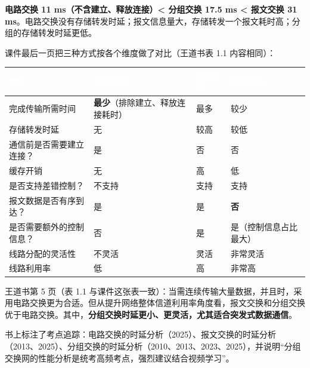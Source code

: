 \documentclass[10.5pt,a4paper,oneside]{article}
\newcommand{\hlred}[1]{\textcolor{wdred}{\bfseries #1}}
\newcommand{\uln}[1]{\CJKunderline[format=\color{wdred},thickness=0.9pt,depth=0.28em]{#1}}
\begin{document}
\hlred{电路交换 11 ms（不含建立、释放连接）\textless{} 分组交换 17.5 ms
\textless{} 报文交换 31 ms}。电路交换没有存储转发时延；报文信息量大，存储转发一个报文耗时高；分组的存储转发时延更低。

课件最后一页把三种方式按各个维度做了对比（王道书表 1.1 内容相同）：

{
\begin{xltabular}{\linewidth}{>{\hsize\raggedright\arraybackslash}X>{\hsize\raggedright\arraybackslash}X>{\hsize\raggedright\arraybackslash}X>{\hsize\raggedright\arraybackslash}X}
\textcolor{white}{\bfseries 特性} & \textcolor{white}{\bfseries 电路交换} & \textcolor{white}{\bfseries 报文交换} & \textcolor{white}{\bfseries 分组交换} \\
\endfirsthead
完成传输所需时间 & \hlred{最少}（排除建立、释放连接耗时） & 最多 & 较少 \\ \hline
存储转发时延 & 无 & 较高 & 较低 \\ \hline
通信前是否需要建立连接？ & 是 & 否 & 否 \\ \hline
缓存开销 & 无 & 高 & 低 \\ \hline
是否支持差错控制？ & 不支持 & 支持 & 支持 \\ \hline
报文数据是否有序到达？ & 是 & 是 & \hlred{否} \\ \hline
是否需要额外的控制信息？ & 否 & 是 & 是（控制信息占比最大） \\ \hline
线路分配的灵活性 & 不灵活 & 灵活 & 非常灵活 \\ \hline
线路利用率 & 低 & 高 & 非常高 \\ \hline
\end{xltabular}\par\vspace{4pt}}

\begin{bookbox}

王道书第 5 页（表 1.1
与课件这张表一致）：当需连续传输大量数据，并且\uln{传输时间远大于连接建立时间}时，采用电路交换更为合适。但从提升网络整体信道利用率角度看，报文交换和分组交换优于电路交换。其中，\hlred{分组交换时延更小、更灵活，尤其适合突发式数据通信}。

书上标注了考点追踪：电路交换的时延分析（2025）、报文交换的时延分析（2013、2025）、分组交换的时延分析（2010、2013、2023、2025），并说明“分组交换网的性能分析是统考高频考点，强烈建议结合视频学习”。

\end{bookbox}
\end{document}
